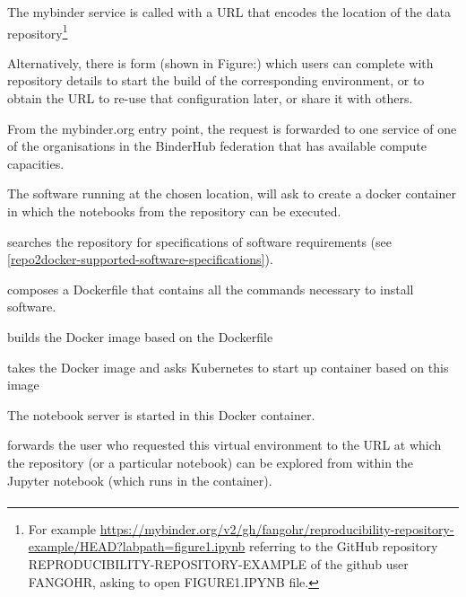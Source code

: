 \begin{compactitem}
\item The mybinder service is called with a URL that encodes the location of the data
  repository\footnote{For example
    {\url{https://mybinder.org/v2/gh/fangohr/reproducibility-repository-example/HEAD?labpath=figure1.ipynb}}
    referring to the GitHub repository REPRODUCIBILITY-REPOSITORY-EXAMPLE of the
    github user FANGOHR, asking to open FIGURE1.IPYNB file.}

  Alternatively, there is form (shown in Figure:) which users can complete with repository details
  to start the build of the corresponding environment, or to obtain the URL to
  re-use that configuration later, or share it with others.
\item From the mybinder.org entry point, the request is forwarded to one
  \binderhub{} service of one of the organisations in the BinderHub federation
  that has available compute capacities.
\item The \binderhub{} software running at the chosen location, will ask
  \repotodocker{} to create a docker container in which the notebooks from the repository can be executed.
\item \repotodocker{} searches the repository for specifications of software requirements (see \ref{repo2docker-supported-software-specifications}).
\item \repotodocker{} composes a Dockerfile that contains all the commands
  necessary to install software.
\item \repotodocker{} builds the Docker image based on the Dockerfile
\item \binderhub{} takes the Docker image and asks Kubernetes to start up
  container based on this image
\item The notebook server is started in this Docker container.
\item \binderhub{} forwards the user who requested this virtual environment to
  the URL at which the repository (or a particular notebook) can be explored
  from within the Jupyter notebook (which runs in the container).
\end{compactitem}

\paragraph{\repotodocker}\label{sec:repo2docker}

